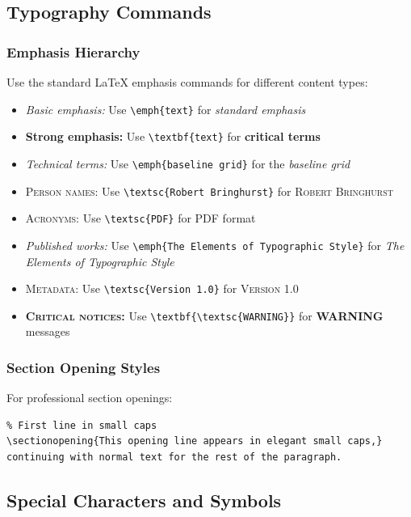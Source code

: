\subsection{Typography Commands}

\subsubsection{Emphasis Hierarchy}

Use the standard LaTeX emphasis commands for different content types:

\begin{itemize}
\item \emph{Basic emphasis:} Use \verb|\emph{text}| for \emph{standard emphasis}
\item \textbf{Strong emphasis:} Use \verb|\textbf{text}| for \textbf{critical terms}
\item \emph{Technical terms:} Use \verb|\emph{baseline grid}| for the \emph{baseline grid}
\item \textsc{Person names:} Use \verb|\textsc{Robert Bringhurst}| for \textsc{Robert Bringhurst}
\item \textsc{Acronyms:} Use \verb|\textsc{PDF}| for \textsc{PDF} format
\item \emph{Published works:} Use \verb|\emph{The Elements of Typographic Style}| for \emph{The Elements of Typographic Style}
\item \textsc{Metadata:} Use \verb|\textsc{Version 1.0}| for \textsc{Version 1.0}
\item \textbf{\textsc{Critical notices:}} Use \verb|\textbf{\textsc{WARNING}}| for \textbf{\textsc{WARNING}} messages
\end{itemize}

\subsubsection{Section Opening Styles}

For professional section openings:

\begin{verbatim}
% First line in small caps
\sectionopening{This opening line appears in elegant small caps,}
continuing with normal text for the rest of the paragraph.
\end{verbatim}

\subsection{Special Characters and Symbols}

